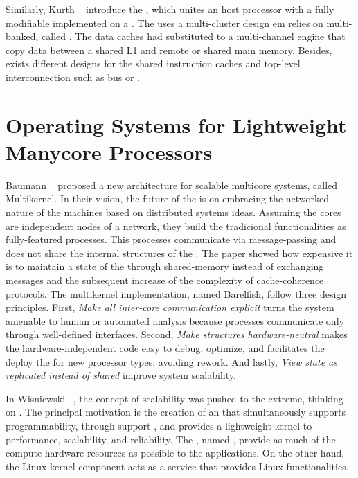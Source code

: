 	Similarly, Kurth \etal~\cite{Kurth2017} introduce the \hero, which unites an \arm
	host processor with a fully modifiable \riscv \manycore implemented on a \fpga.
	The \pmca uses a multi-cluster design em relies on multi-banked, called \spms.
	The data caches had substituted to a multi-channel \dma engine that copy data
	between a shared L1 \spm and remote \spms or shared main memory.
	Besides, exists different designs for the shared instruction caches and
	top-level interconnection such as bus or \noc.

\section{Operating Systems for Lightweight Manycore Processors}

	Baumann \etal~\cite{Baumann2009} proposed a new \os architecture for scalable multicore
	systems, called Multikernel.
	In their vision, the future of the \oses is on embracing the networked nature
	of the machines based on distributed systems ideas.
	Assuming the cores are independent nodes of a network, they build the tradicional
	\os functionalities as fully-featured processes.
	This processes communicate via message-passing and does not share the internal
	structures of the \os.
	The paper showed how expensive it is to maintain a state of the \os through
	shared-memory instead of exchanging messages and the subsequent increase of
	the complexity of cache-coherence protocols.
	The multikernel implementation, named Barelfish, follow three design principles.
	First, \textit{Make all inter-core communication explicit} turns the system
	amenable to human or automated analysis because processes communicate only
	through well-defined interfaces.
	Second, \textit{Make \os structures hardware-neutral} makes the hardware-independent
	code easy to debug, optimize, and facilitates the deploy the \os for new
	processor types, avoiding rework.
	And lastly, \textit{View \os state as replicated instead of shared} improve system
	scalability.

	In Wisniewski~\cite{Wisniewski2014} \etal, the concept of scalability was pushed
	to the extreme, thinking on \hpc.
	The principal motivation is the creation of an \os that simultaneously supports
	programmability, through support \linux \api, and provides a lightweight kernel
	to performance, scalability, and reliability.
	The \os, named \mos, provide as much of the compute hardware resources as
	possible to the \hpc applications. On the other hand, the Linux kernel
	component acts as a service that provides Linux functionalities.
	
